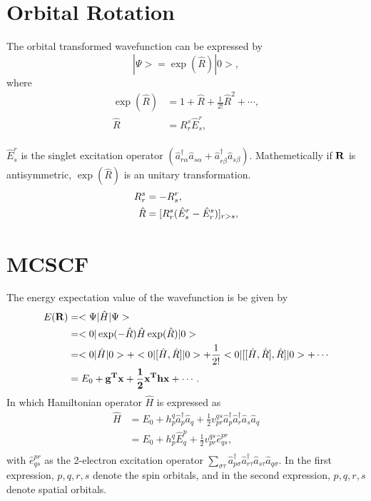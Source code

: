 \documentclass[a4paper,12pt,oneside]{book}
\begin{document}
\section{Orbital Rotation}
The orbital transformed wavefunction can be expressed by
\begin{equation}
  |\Psi> = \exp(\hat{R})|0>,
\end{equation}
where
\begin{equation}
\begin{aligned}
  \exp(\hat{R}) &= 1+\hat{R}+\frac{1}{2!}\hat{R}^2+ \cdots, \\
  \hat{R} &= R_r^s\hat{E}_s^r,\\
\end{aligned}
\end{equation}

$\hat{E}^r_s$ is the singlet excitation operator $(\hat{a}_{r\alpha}^{\dagger}\hat{a}_{s\alpha}+\hat{a}_{r\beta}^{\dagger}\hat{a}_{s\beta} )$. 
Mathemetically if $\bf{R}$ is antisymmetric, $\exp(\hat{R})$ is an unitary transformation.
\begin{equation}
  \begin{aligned}
    R_r^s &= -R_s^r,\\
    \hat{R} &= [R_r^s(\hat{E}_s^r-\hat{E}_r^s)]_{r\mathchar"313E s},
  \end{aligned}
  \end{equation}

\section{MCSCF}
The energy expectation value of the wavefunction is be given by
\begin{equation}
\begin{aligned}
E(\bf{R}) &= <\Psi|\hat{H}|\Psi> \\
&= <0|\exp(-\hat{R})\hat{H}\exp(\hat{R})|0> \\
&= <0|\hat{H}|0> + <0|[\hat{H},\hat{R}]|0> + \frac{1}{2!}< 0|[[\hat{H},\hat{R}], \hat{R}]|0> + \cdots\\
&= E_0+\bf{g}^T\bf{x} +\frac{1}{2} \bf{x}^T\bf{hx}+ \cdots.\\
\end{aligned}
\end{equation}
In which Hamiltonian operator $\hat{H}$ is expressed as
\begin{equation}
\begin{aligned}
\hat{H} &= E_0 + h^q_p\hat{a}_p^\dagger\hat{a}_q + \frac{1}{2}v^{qs}_{pr}\hat{a}_p^\dagger\hat{a}_r^\dagger\hat{a}_s\hat{a}_q\\
&= E_0 + h^q_p\hat{E}^p_q + \frac{1}{2}v^{qs}_{pr}\hat{e}^{pr}_{qs},\\
\end{aligned}
\end{equation}
with $\hat{e}^{pr}_{qs}$ as the 2-electron excitation operator $\sum_{\sigma\tau}\hat{a}_{p\sigma}^\dagger\hat{a}_{r\tau}^\dagger\hat{a}_{s\tau}\hat{a}_{q\sigma}$.
In the first expression, $p,q,r,s$ denote the spin orbitals, and in the second expression, $p,q,r,s$ denote spatial orbitals.
\end{document}

